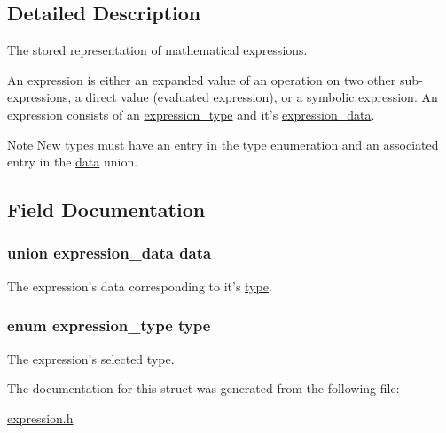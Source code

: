 \subsection{Detailed Description}
The stored representation of mathematical expressions. 

An expression is either an expanded value of an operation on two other sub-\/expressions, a direct value (evaluated expression), or a symbolic expression. An expression consists of an \hyperlink{expression_8h_a5a6601c4e142145f0e87051cb21ece0f}{expression\+\_\+type} and it's \hyperlink{unionexpression__data}{expression\+\_\+data}.\begin{DoxyNote}{Note}
New types must have an entry in the \hyperlink{structexpression_a6c50b44c70231c1b3752f8516daa967c}{type} enumeration and an associated entry in the \hyperlink{structexpression_addb4bda6d311d21f3fd2bfdd12fc70ab}{data} union. 
\end{DoxyNote}


\subsection{Field Documentation}
\hypertarget{structexpression_addb4bda6d311d21f3fd2bfdd12fc70ab}{
\subsubsection[{data}]{\setlength{\rightskip}{0pt plus 5cm}union {\bf expression\+\_\+data} data}}\label{structexpression_addb4bda6d311d21f3fd2bfdd12fc70ab}


The expression's data corresponding to it's \hyperlink{structexpression_a6c50b44c70231c1b3752f8516daa967c}{type}. 

\hypertarget{structexpression_a6c50b44c70231c1b3752f8516daa967c}{
\subsubsection[{type}]{\setlength{\rightskip}{0pt plus 5cm}enum {\bf expression\+\_\+type} type}}\label{structexpression_a6c50b44c70231c1b3752f8516daa967c}


The expression's selected type. 



The documentation for this struct was generated from the following file\+:\begin{DoxyCompactItemize}
\item 
\hyperlink{expression_8h}{expression.\+h}\end{DoxyCompactItemize}
